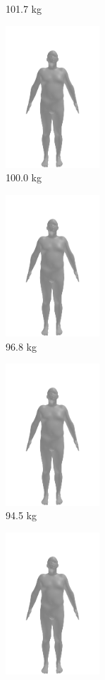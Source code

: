 \begin{figure}[h]
\begin{subfigure}{0.3\textwidth}
		\caption{101.7 kg}
	\end{subfigure}
	\begin{subfigure}{0.3\textwidth}
		\centering
		\includegraphics[width=100pt]{files/patients/2_9}
		\caption{100.0 kg}
	\end{subfigure}
	\begin{subfigure}{0.3\textwidth}
		\centering
		\includegraphics[width=100pt]{files/patients/2_10}
		\caption{96.8 kg}
	\end{subfigure}
	\begin{subfigure}{0.3\textwidth}
		\centering
		\includegraphics[width=100pt]{files/patients/2_11}
		\caption{94.5 kg}
	\end{subfigure}
	\linebreak
	\begin{subfigure}{0.3\textwidth}
		\centering
		\includegraphics[width=100pt]{files/patients/2_predicted.png}

\end{subfigure}
\end{figure}
